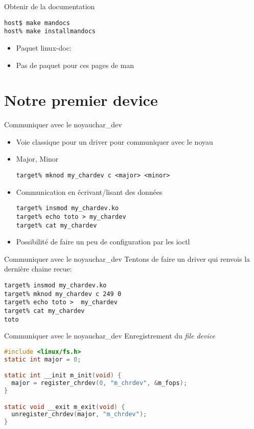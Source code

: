 \begin{frame}[fragile=singleslide]{Obtenir de la documentation}
  \begin{lstlisting}
host$ make mandocs
host% make installmandocs
  \end{lstlisting}  %
  \begin{itemize}
    \item Paquet linux-doc: 
    \item Pas de paquet pour ces pages de man 
  \end{itemize}
\end{frame}

\section{Notre premier device}

\begin{frame}[fragile=singleslide]{Communiquer avec le noyau}{char\_dev}
  \begin{itemize}
  \item Voie classique pour un driver pour communiquer avec le noyau
  \item Major, Minor
    \begin{lstlisting}
target% mknod my_chardev c <major> <minor>
    \end{lstlisting}
  \item Communication en écrivant/lisant des données
    \begin{lstlisting}
target% insmod my_chardev.ko
target% echo toto > my_chardev
target% cat my_chardev
    \end{lstlisting}
  \item Possibilité de faire un peu de configuration par les ioctl
  \end{itemize}
\end{frame}

\begin{frame}[fragile=singleslide]{Communiquer avec le noyau}{char\_dev}
  Tentons de faire un driver qui renvois la dernière chaine recue:
  \begin{lstlisting}
target% insmod my_chardev.ko
target% mknod my_chardev c 249 0
target% echo toto >  my_chardev
target% cat my_chardev
toto
  \end{lstlisting}
\end{frame}

\begin{frame}[fragile=singleslide]{Communiquer avec le noyau}{char\_dev}
  Enregistrement du \emph{file device}
  \begin{lstlisting}[language=c]
#include <linux/fs.h>
static int major = 0;

static int __init m_init(void) {
  major = register_chrdev(0, "m_chrdev", &m_fops);
}

static void __exit m_exit(void) {
  unregister_chrdev(major, "m_chrdev");
}

  \end{lstlisting}
\end{frame}

